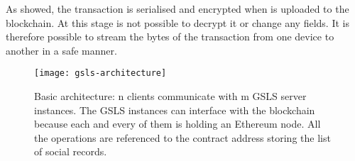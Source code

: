 As showed, the transaction is serialised and encrypted when is uploaded to the blockchain.
At this stage is not possible to decrypt it or change any fields. It is therefore possible to stream the bytes of the transaction from one device to another in a safe manner.
\\

\begin{figure}[h]
	\centering
  \texttt{[image: gsls-architecture]}
	\caption{Basic architecture: n clients communicate with m GSLS server instances. The GSLS instances can interface with the blockchain because each and every of them is holding an Ethereum node. All the operations are referenced to the contract address storing the list of social records.}
	\label{fig4}
\end{figure}
